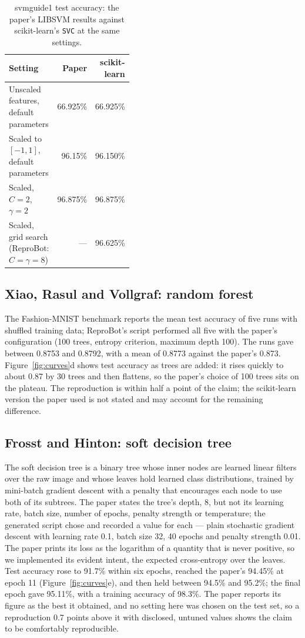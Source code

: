 \documentclass[11pt]{article}
\begin{document}
\begin{table}[tbp]
\centering
\small
\caption{svmguide1 test accuracy: the paper's LIBSVM results against scikit-learn's
\texttt{SVC} at the same settings.}
\label{tab:svm}
\begin{tabular}{L{0.42\linewidth}rr}
\toprule
Setting & Paper & scikit-learn \\
\midrule
Unscaled features, default parameters & 66.925\% & 66.925\% \\
Scaled to $[-1, 1]$, default parameters & 96.15\% & 96.150\% \\
Scaled, $C = 2$, $\gamma = 2$ & 96.875\% & 96.875\% \\
Scaled, grid search (ReproBot: $C = \gamma = 8$) & --- & 96.625\% \\
\bottomrule
\end{tabular}
\end{table}

\subsection{Xiao, Rasul and Vollgraf: random forest}

The Fashion-MNIST benchmark reports the mean test accuracy of five runs with shuffled training
data; ReproBot's script performed all five with the paper's configuration (100 trees, entropy
criterion, maximum depth 100). The runs gave between 0.8753 and 0.8792, with a mean of 0.8773
against the paper's 0.873. Figure~\ref{fig:curves}d shows test accuracy as trees are added: it
rises quickly to about 0.87 by 30 trees and then flattens, so the paper's choice of 100 trees
sits on the plateau. The reproduction is within half a point of the claim; the scikit-learn
version the paper used is not stated and may account for the remaining difference.

\subsection{Frosst and Hinton: soft decision tree}

The soft decision tree is a binary tree whose inner nodes are learned linear filters over the raw image and whose leaves hold learned class distributions, trained by mini-batch gradient descent with a penalty that encourages each node to use both of its subtrees. The paper states the tree's depth, 8, but not its learning rate, batch size, number of epochs, penalty strength or temperature; the generated script chose and recorded a value for each --- plain stochastic gradient descent with learning rate 0.1, batch size 32, 40 epochs and penalty strength 0.01. The paper prints its loss as the logarithm of a quantity that is never positive, so we implemented its evident intent, the expected cross-entropy over the leaves. Test accuracy rose to 91.7\% within six epochs, reached the paper's 94.45\% at epoch 11 (Figure~\ref{fig:curves}e), and then held between 94.5\% and 95.2\%; the final epoch gave 95.11\%, with a training accuracy of 98.3\%. The paper reports its figure as the best it obtained, and no setting here was chosen on the test set, so a reproduction 0.7 points above it with disclosed, untuned values shows the claim to be comfortably reproducible.
\end{document}
